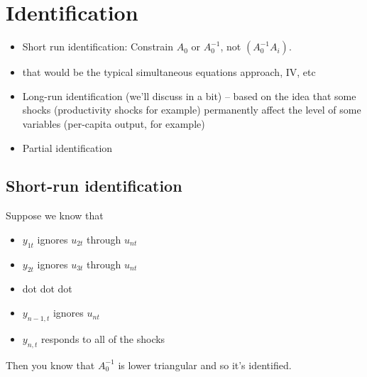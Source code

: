 \section{Identification}

\begin{itemize}
\item Short run identification: Constrain $A_0$ or $A_0^{-1}$, not
  $(A_0^{-1} A_i)$.
\item that would be the typical simultaneous equations approach, IV,
  etc
\item Long-run identification (we'll discuss in a bit) -- based on the
  idea that some shocks (productivity shocks for example) permanently
  affect the level of some variables (per-capita output, for example)
\item Partial identification
\end{itemize}

\subsection{Short-run identification}

Suppose we know that
\begin{itemize}
\item $y_{1t}$ ignores $u_{2t}$ through $u_{nt}$
\item $y_{2t}$ ignores $u_{3t}$ through $u_{nt}$
\item dot dot dot
\item $y_{n-1,t}$ ignores $u_{nt}$
\item $y_{n,t}$ responds to all of the shocks
\end{itemize}
Then you know that $A_0^{-1}$ is lower triangular and so it's
identified.

